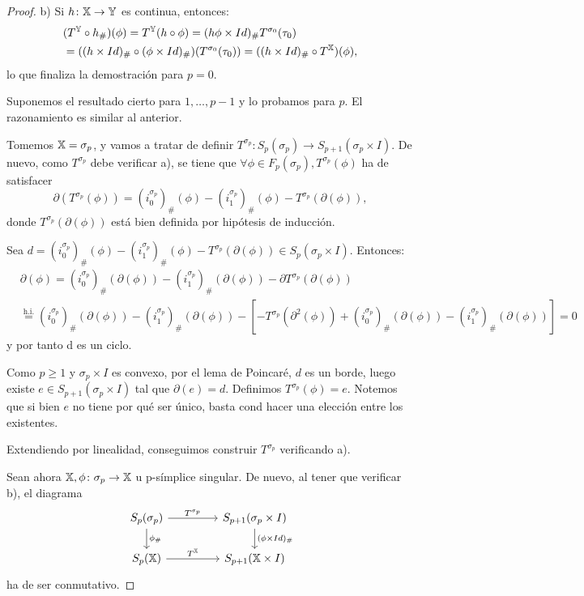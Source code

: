\begin{proof}
  b) Si $h \colon {\mathbb X} \to {\mathbb Y}$ es continua, entonces:
  \begin{align*}
    &(T^{\mathbb Y} \circ h_\#)(\phi) = T^{\mathbb Y}(h \circ \phi) = (h\phi \times Id)_\# T^{\sigma_0}(\tau_0) \\
    &= ((h \times Id)_\# \circ (\phi \times Id)_\#) (T^{\sigma_0}(\tau_0)) = ((h \times Id)_\# \circ T^{\mathbb X})(\phi),
  \end{align*}
  lo que finaliza la demostración para $p = 0$.

  Suponemos el resultado cierto para $1, \dots, p-1$ y lo probamos para $p$. El razonamiento es similar al anterior.

  Tomemos ${\mathbb X} = \sigma_p$, y vamos a tratar de definir $T^{\sigma_p} \colon S_p(\sigma_p) \to S_{p+1}(\sigma_p \times I)$.
  De nuevo, como $T^{\sigma_p}$ debe verificar a), se tiene que $\forall \phi \in F_p(\sigma_p), T^{\sigma_p}(\phi)$ ha de satisfacer
  \[ \partial(T^{\sigma_p}(\phi)) = (i_0^{\sigma_p})_\# (\phi) - (i_1^{\sigma_p})_\# (\phi) - T^{\sigma_p}(\partial(\phi)), \]
  donde $T^{\sigma_p}(\partial(\phi))$ está bien definida por hipótesis de inducción.

  Sea $d = (i_0^{\sigma_p})_\# (\phi) - (i_1^{\sigma_p})_\# (\phi) - T^{\sigma_p}(\partial(\phi)) \in S_p(\sigma_p \times I)$.
  Entonces:
  \begin{align*}
    &\partial(\phi) = (i_0^{\sigma_p})_\# (\partial(\phi)) - (i_1^{\sigma_p})_\# (\partial(\phi)) - \partial T^{\sigma_p}(\partial(\phi)) \\
    &\stackrel{\text{h.i.}}{=} (i_0^{\sigma_p})_\#(\partial(\phi)) - (i_1^{\sigma_p})_\#(\partial(\phi)) - [ - T^{\sigma_p}(\partial^2(\phi)) +
    (i_0^{\sigma_p})_\#(\partial(\phi)) - (i_1^{\sigma_p})_\#(\partial(\phi)) ] = 0
  \end{align*}
  y por tanto d es un ciclo.

  Como $p \geq 1$ y $\sigma_p \times I$ es convexo, por el lema de Poincaré, $d$ es un borde, luego existe $e \in S_{p+1}(\sigma_p \times I)$
  tal que $\partial(e) = d$. Definimos $T^{\sigma_p}(\phi) = e$. Notemos que si bien $e$ no tiene por qué ser único, basta cond hacer una elección
  entre los existentes.

  Extendiendo por linealidad, conseguimos construir $T^{\sigma_p}$ verificando a).

  Sean ahora ${\mathbb X}, \phi \colon \sigma_p \to {\mathbb X}$ u p-símplice singular. De nuevo, al tener que verificar b), el diagrama
  \[
  \begin{tikzcd}
    S_p(\sigma_p) \arrow{r}{T^{\sigma_p}} \arrow{d}{\phi_\#} & [2em] S_{p+1}(\sigma_p \times I) \arrow{d}{(\phi \times Id)_\#} \\
    \SX{p} \arrow{r}{T^\X}                 & S_{p+1}(\X \times I)
  \end{tikzcd}
  \]
  ha de ser conmutativo.


\end{proof}
